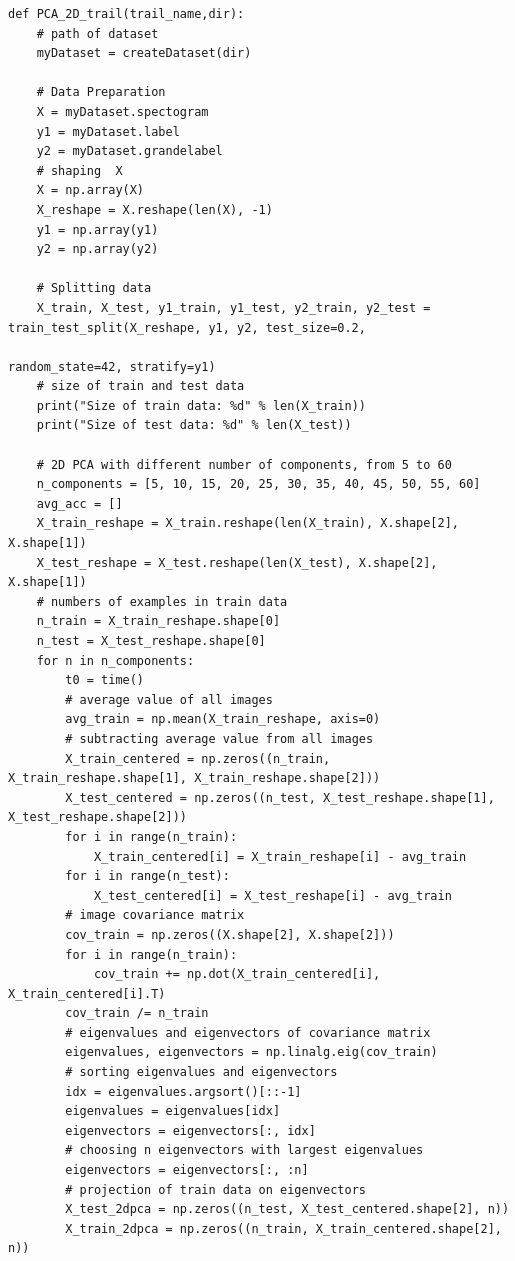 \documentclass{cta-author}
\begin{document}
\begin{lstlisting}
def PCA_2D_trail(trail_name,dir):
    # path of dataset
    myDataset = createDataset(dir)

    # Data Preparation
    X = myDataset.spectogram
    y1 = myDataset.label
    y2 = myDataset.grandelabel
    # shaping  X
    X = np.array(X)
    X_reshape = X.reshape(len(X), -1)
    y1 = np.array(y1)
    y2 = np.array(y2)

    # Splitting data
    X_train, X_test, y1_train, y1_test, y2_train, y2_test = train_test_split(X_reshape, y1, y2, test_size=0.2,
                                                                             random_state=42, stratify=y1)
    # size of train and test data
    print("Size of train data: %d" % len(X_train))
    print("Size of test data: %d" % len(X_test))

    # 2D PCA with different number of components, from 5 to 60
    n_components = [5, 10, 15, 20, 25, 30, 35, 40, 45, 50, 55, 60]
    avg_acc = []
    X_train_reshape = X_train.reshape(len(X_train), X.shape[2], X.shape[1])
    X_test_reshape = X_test.reshape(len(X_test), X.shape[2], X.shape[1])
    # numbers of examples in train data
    n_train = X_train_reshape.shape[0]
    n_test = X_test_reshape.shape[0]
    for n in n_components:
        t0 = time()
        # average value of all images
        avg_train = np.mean(X_train_reshape, axis=0)
        # subtracting average value from all images
        X_train_centered = np.zeros((n_train, X_train_reshape.shape[1], X_train_reshape.shape[2]))
        X_test_centered = np.zeros((n_test, X_test_reshape.shape[1], X_test_reshape.shape[2]))
        for i in range(n_train):
            X_train_centered[i] = X_train_reshape[i] - avg_train
        for i in range(n_test):
            X_test_centered[i] = X_test_reshape[i] - avg_train
        # image covariance matrix
        cov_train = np.zeros((X.shape[2], X.shape[2]))
        for i in range(n_train):
            cov_train += np.dot(X_train_centered[i], X_train_centered[i].T)
        cov_train /= n_train
        # eigenvalues and eigenvectors of covariance matrix
        eigenvalues, eigenvectors = np.linalg.eig(cov_train)
        # sorting eigenvalues and eigenvectors
        idx = eigenvalues.argsort()[::-1]
        eigenvalues = eigenvalues[idx]
        eigenvectors = eigenvectors[:, idx]
        # choosing n eigenvectors with largest eigenvalues
        eigenvectors = eigenvectors[:, :n]
        # projection of train data on eigenvectors
        X_test_2dpca = np.zeros((n_test, X_test_centered.shape[2], n))
        X_train_2dpca = np.zeros((n_train, X_train_centered.shape[2], n))

\end{lstlisting}
\end{document}
